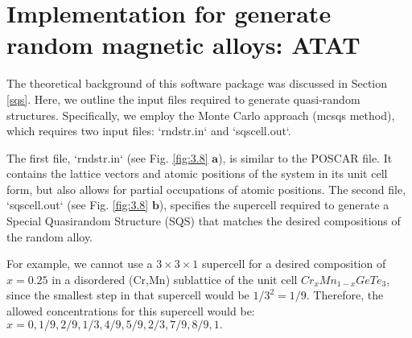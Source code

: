 \section{Implementation for generate random magnetic alloys: ATAT}

The theoretical background of this software package was discussed in Section \ref{sqs}. Here, we outline the input files required to generate quasi-random structures. Specifically, we employ the Monte Carlo approach (mcsqs method), which requires two input files: `rndstr.in` and `sqscell.out`.

The first file, `rndstr.in` (see Fig. \ref{fig:3.8} $\mathbf{a}$), is similar to the POSCAR file. It contains the lattice vectors and atomic positions of the system in its unit cell form, but also allows for partial occupations of atomic positions. The second file, `sqscell.out` (see Fig. \ref{fig:3.8} $\mathbf{b}$), specifies the supercell required to generate a Special Quasirandom Structure (SQS) that matches the desired compositions of the random alloy. 

For example, we cannot use a $3\times3\times1$ supercell for a desired composition of $x=0.25$ in a disordered (Cr,Mn) sublattice of the unit cell $Cr_{x}Mn_{1-x}GeTe_{3}$, since the smallest step in that supercell would be $1/3^2 = 1/9$. Therefore, the allowed concentrations for this supercell would be: 
$x=0, 1/9, 2/9, 1/3, 4/9, 5/9, 2/3, 7/9, 8/9, 1.$ \\

